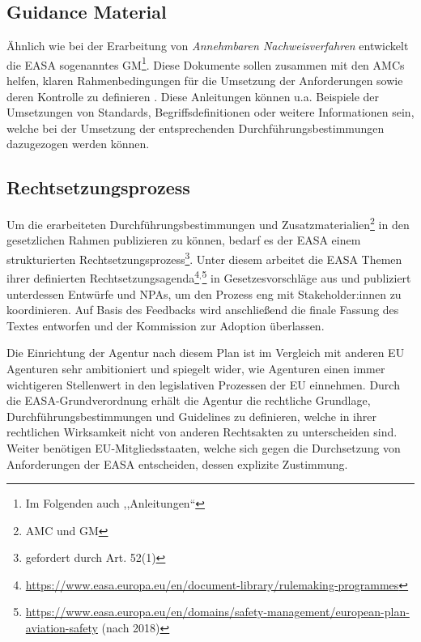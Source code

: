         \subsection{Guidance Material}

    Ähnlich wie bei der Erarbeitung von \textit{Annehmbaren Nachweisverfahren} entwickelt die \ac{EASA} sogenanntes \acf{GM}\footnote{Im Folgenden auch ,,Anleitungen``}.
    Diese Dokumente sollen zusammen mit den \acp{AMC} helfen, klaren Rahmenbedingungen für die Umsetzung der Anforderungen sowie deren Kontrolle zu definieren
    \cite[7]{easa_2017001r}.
    Diese Anleitungen können u.a. Beispiele der Umsetzungen von Standards, Begriffsdefinitionen oder weitere Informationen sein, welche bei der Umsetzung der entsprechenden Durchführungsbestimmungen dazugezogen werden können.

        \subsection{Rechtsetzungsprozess}

    Um die erarbeiteten Durchführungsbestimmungen und Zusatzmaterialien\footnote{\ac{AMC} und \ac{GM}} in den gesetzlichen Rahmen publizieren zu können, bedarf es der \ac{EASA} einem strukturierten Rechtsetzungsprozess\footnote{gefordert durch Art. 52(1) }.
    Unter diesem arbeitet die \ac{EASA} Themen ihrer definierten Rechtsetzungsagenda\footnote{\href{https://www.easa.europa.eu/en/document-library/rulemaking-programmes}{https://www.easa.europa.eu/en/document-library/rulemaking-programmes}}$^,$\footnote{\href{https://www.easa.europa.eu/en/domains/safety-management/european-plan-aviation-safety}{https://www.easa.europa.eu/en/domains/safety-management/european-plan-aviation-safety} (nach 2018)} in Gesetzesvorschläge aus und publiziert unterdessen Entwürfe und \acfp{NPA}, um den Prozess eng mit Stakeholder:innen zu koordinieren.
    Auf Basis des Feedbacks wird anschließend die finale Fassung des Textes entworfen und der Kommission zur Adoption überlassen. \cite[3]{easa_2017001r} 
        
\pagebreak
\noindent
Die Einrichtung der Agentur nach diesem Plan ist im Vergleich mit anderen \ac{EU} Agenturen sehr ambitioniert und spiegelt wider, wie Agenturen einen immer wichtigeren Stellenwert in den legislativen Prozessen der \ac{EU} einnehmen. 
Durch die \ac{EASA}-Grundverordnung erhält die Agentur die rechtliche Grundlage, Durchführungsbestimmungen und Guidelines zu definieren, welche in ihrer rechtlichen Wirksamkeit nicht von anderen Rechtsakten zu unterscheiden sind.
Weiter benötigen \ac{EU}-Mitgliedsstaaten, welche sich gegen die Durchsetzung von Anforderungen der \ac{EASA} entscheiden, dessen explizite Zustimmung.   
\cite[260]{easa_administrative_innovation}
        

